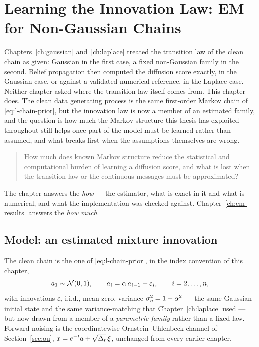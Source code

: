 %

\chapter{Learning the Innovation Law: EM for Non-Gaussian Chains}
\label{ch:em-method}

Chapters~\ref{ch:gaussian} and~\ref{ch:laplace} treated the transition law of
the clean chain as given: Gaussian in the first case, a fixed non-Gaussian
family in the second. Belief propagation then computed the diffusion score
exactly, in the Gaussian case, or against a validated numerical reference, in
the Laplace case. Neither chapter asked where the transition law itself comes
from. This chapter does. The clean data generating process is the same
first-order Markov chain of \eqref{eq:l-chain-prior}, but the innovation law
is now a member of an estimated family, and the question is how much the
Markov structure this thesis has exploited throughout still helps once part of
the model must be learned rather than assumed, and what breaks first when the
assumptions themselves are wrong.

\begin{quote}
How much does known Markov structure reduce the statistical and computational
burden of learning a diffusion score, and what is lost when the transition law
or the continuous messages must be approximated?
\end{quote}

The chapter answers the \emph{how} --- the estimator, what is exact in it and
what is numerical, and what the implementation was checked against.
Chapter~\ref{ch:em-results} answers the \emph{how much}.

\section{Model: an estimated mixture innovation}\label{sec:em-model}

The clean chain is the one of \eqref{eq:l-chain-prior}, in the index
convention of this chapter,
\begin{equation}
  a_1 \sim \mathcal{N}(0,1), \qquad a_i = \alpha\, a_{i-1} + \varepsilon_i,
  \qquad i = 2,\dots,n,
  \label{eq:em-chain}
\end{equation}
with innovations $\varepsilon_i$ i.i.d., mean zero, variance
$\sigma_\eta^2 = 1-\alpha^2$ --- the same Gaussian initial state and the same
variance-matching that Chapter~\ref{ch:laplace} used --- but now drawn from
a member of a \emph{parametric family} rather than a fixed law. Forward noising is the coordinatewise
Ornstein--Uhlenbeck channel of Section~\ref{sec:ou},
$x = e^{-t} a + \sqrt{\Delta_t}\,\xi$, unchanged from every earlier chapter.

